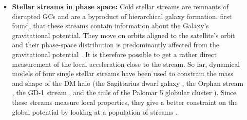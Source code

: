 \begin{itemize}
    \iffalse\item Kinematics of nearby stars: \cite{Kuijken...LocalDMdens...1989, Bovy...LocalDMdens...2012} \fi
    \item \textbf{Stellar streams in phase space:} Cold stellar streams are remnants of disrupted \acp{GC} and are a byproduct of hierarchical galaxy formation. \citet{Johnston...MWstreams...1999} first found, that these streams contain information about the Galaxy's gravitational potential. They move on orbits aligned to the satellite's orbit \citep{Eyre...streamstheo...2011} and their phase-space distribution is predominantly affected from the gravitational potential \citep{Kupper...streams...2010, Kupper...streams...2012}. It is therefore possible to get a rather direct measurement of the local acceleration close to the stream. So far, dynamical models of four single stellar streams have been used to constrain the mass and shape of the \ac{DM} halo (the Sagittarius dwarf galaxy \citep{Law...sagstream...2010, Gibbons...sagstream...2014, Dierickx...sagstream..2017}, the Orphan stream \citep{Newberg...orphanstream..2010}, the GD-1 stream \citep{Koposov...GD1stream...2010, Bowden...GD1stream...2015, Malhan...GD1stream...2018}, and the tails of the Palomar 5 globular cluster \citep{Kupper...pal5stream...2015}). Since these streams measure local properties, they give a better constraint on the global potential by looking at a population of streams \citep{Bonaca...streamsinfo...2018}.
    

\end{itemize}
